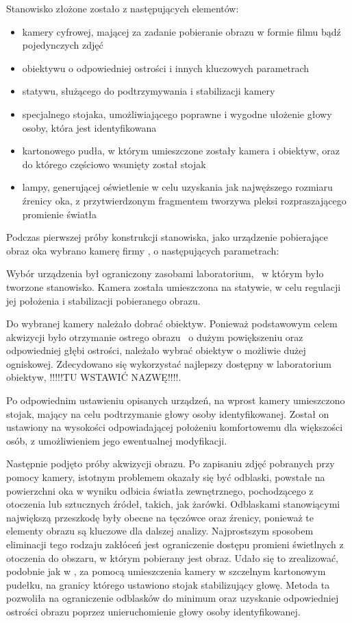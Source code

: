 Stanowisko złożone zostało z następujących elementów:
\begin{itemize}
 \item kamery cyfrowej, mającej za zadanie pobieranie obrazu w formie filmu bądź pojedynczych zdjęć
 \item obiektywu o odpowiedniej ostrości i innych kluczowych parametrach
 \item statywu, służącego do podtrzymywania i stabilizacji kamery
 \item specjalnego stojaka, umożliwiającego poprawne i wygodne ułożenie głowy osoby, która jest identyfikowana
 \item kartonowego pudła, w którym umieszczone zostały kamera i obiektyw, oraz do którego częściowo wsunięty został stojak 
 \item lampy, generującej oświetlenie w celu uzyskania jak najwęższego rozmiaru źrenicy oka, z przytwierdzonym fragmentem tworzywa pleksi rozpraszającego promienie światła
 \end{itemize}

Podczas pierwszej próby konstrukcji stanowiska, jako urządzenie pobierające obraz oka wybrano kamerę firmy , o następujących parametrach:

Wybór urządzenia był ograniczony zasobami laboratorium, ~w którym było tworzone stanowisko. Kamera została umieszczona na statywie, w celu regulacji jej położenia i stabilizacji pobieranego obrazu.

Do wybranej kamery należało dobrać obiektyw. Ponieważ podstawowym celem akwizycji było otrzymanie ostrego obrazu ~o dużym powiększeniu oraz odpowiedniej głębi ostrości, należało wybrać obiektyw o możliwie dużej ogniskowej. Zdecydowano się wykorzystać najlepszy dostępny w laboratorium obiektyw, !!!!!TU WSTAWIĆ NAZWĘ!!!!.

Po odpowiednim ustawieniu opisanych urządzeń, na wprost kamery umieszczono stojak, mający na celu podtrzymanie głowy osoby identyfikowanej. Został on ustawiony na wysokości odpowiadającej położeniu komfortowemu dla większości osób, z umożliwieniem jego ewentualnej modyfikacji.

Następnie podjęto próby akwizycji obrazu. Po zapisaniu zdjęć pobranych przy pomocy kamery, istotnym problemem okazały się być odblaski, powstałe na powierzchni oka w wyniku odbicia światła zewnętrznego, pochodzącego z otoczenia lub sztucznych źródeł, takich, jak żarówki. Odblaskami stanowiącymi największą przeszkodę były obecne na tęczówce oraz źrenicy, ponieważ te elementy obrazu są kluczowe dla dalszej analizy. Najprostszym sposobem eliminacji tego rodzaju zakłóceń jest ograniczenie dostępu promieni świetlnych z otoczenia do obszaru, w którym pobierany jest obraz. Udało się to zrealizować, podobnie jak w \cite{Gl11}, za pomocą umieszczenia kamery w szczelnym kartonowym pudełku, na granicy którego ustawiono stojak stabilizujący głowę. Metoda ta pozwoliła na ograniczenie odblasków do minimum oraz uzyskanie odpowiedniej ostrości obrazu poprzez unieruchomienie głowy osoby identyfikowanej.

